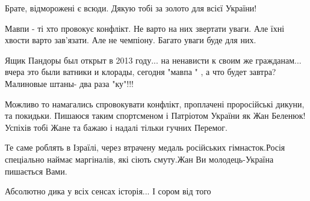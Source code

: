 \begin{itemize}
Брате, відморожені є всюди. Дякую тобі за золото для всієї України!

 
Мавпи - ті хто провокує конфлікт. Не варто на них звертати уваги. Але їхні хвости варто зав'язати. Але не чемпіону. Багато уваги буде для них.

 

Ящик Пандоры был открыт в 2013 году... на ненависти к своим же гражданам... вчера
это были ватники и клорады, сегодня "мавпа " , а что будет завтра? Малиновые
штаны- два раза "ку"!!!


 
Можливо то намагались спровокувати конфлікт, проплачені проросійські дикуни, та покидьки.
Пишаюся таким спортсменом і Патріотом України як Жан Беленюк!
Успіхів тобі Жане та бажаю і надалі тільки гучних Перемог.

 
Те саме роблять в Ізраїлі, через втрачену медаль російських гімнасток.Росія спеціально наймає маргіналів, які сіють смуту.Жан Ви молодець-Україна пишається Вами.

 
Абсолютно дика у всіх сенсах історія... І сором від того

 

\end{itemize}
